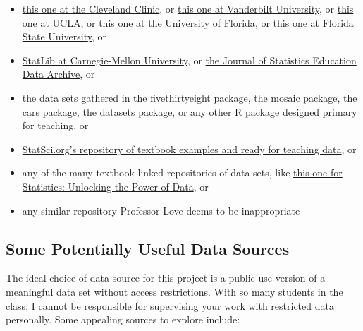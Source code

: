 \documentclass[]{book}
\providecommand{\tightlist}{%
  \setlength{\itemsep}{0pt}\setlength{\parskip}{0pt}}
\theoremstyle{definition}
\theoremstyle{definition}
\theoremstyle{definition}
\theoremstyle{remark}
\begin{document}
\begin{itemize}
\tightlist
\item
  \href{http://www.lerner.ccf.org/qhs/datasets/}{this one at the
  Cleveland Clinic}, or
  \href{http://biostat.mc.vanderbilt.edu/wiki/Main/DataSets}{this one at
  Vanderbilt University}, or
  \href{http://www.stat.ucla.edu/projects/datasets/}{this one at UCLA},
  or \href{http://www.stat.ufl.edu/~winner/datasets.html}{this one at
  the University of Florida}, or
  \href{http://people.sc.fsu.edu/~jburkardt/datasets/datasets.html}{this
  one at Florida State University}, or
\item
  \href{http://lib.stat.cmu.edu/datasets/}{StatLib at Carnegie-Mellon
  University}, or
  \href{http://www.amstat.org/publications/jse/jse_data_archive.htm}{the
  Journal of Statistics Education Data Archive}, or
\item
  the data sets gathered in the fivethirtyeight package, the mosaic
  package, the cars package, the datasets package, or any other R
  package designed primary for teaching, or
\item
  \href{http://www.statsci.org/datasets.html}{StatSci.org's repository
  of textbook examples and ready for teaching data}, or
\item
  any of the many textbook-linked repositories of data sets, like
  \href{http://www.lock5stat.com/datapage.html}{this one for Statistics:
  Unlocking the Power of Data}, or
\item
  any similar repository Professor Love deems to be inappropriate
\end{itemize}

\hypertarget{some-potentially-useful-data-sources}{%
\subsection{Some Potentially Useful Data
Sources}\label{some-potentially-useful-data-sources}}

The ideal choice of data source for this project is a public-use version
of a meaningful data set without access restrictions. With so many
students in the class, I cannot be responsible for supervising your work
with restricted data personally. Some appealing sources to explore
include:
\end{document}

